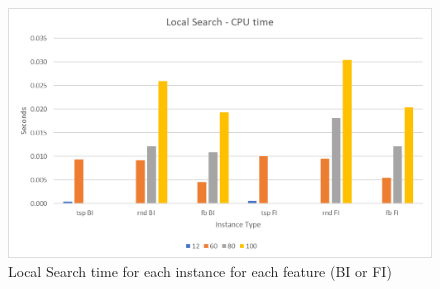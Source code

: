 	\begin{figure}[hb]
		\centering
		\includegraphics[width=\linewidth]{img/LS-time}
		\caption{Local Search time for each instance for each feature (BI or FI)}
		\label{fig:ls-time}
	\end{figure}
	
